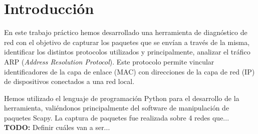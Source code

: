 \section{Introducción}

En este trabajo práctico hemos desarrollado una herramienta de diagnóstico de red con el objetivo de capturar los paquetes que se envían a través de la misma, identificar los distintos protocolos utilizados y principalmente, analizar el tráfico ARP (\textit{Address Resolution Protocol}). Este protocolo permite vincular identificadores de la capa de enlace (MAC) con direcciones de la capa de red (IP) de dispositivos conectados a una red local.

Hemos utilizado el lenguaje de programación Python para el desarrollo de la herramienta, valiéndonos principalmente del software de manipulación de paquetes Scapy. La captura de paquetes fue realizada sobre 4 redes que... \textbf{TODO:} Definir cuáles van a ser...

